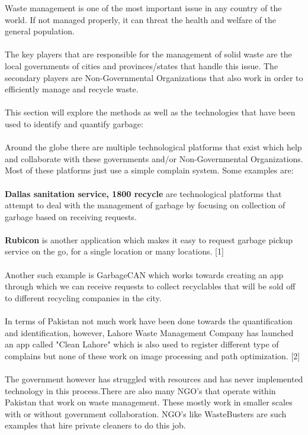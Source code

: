 Waste management is one of the most important issue in any country of the world. If not managed properly, it can threat the health and welfare of the general population.\\
\\
The key players that are responsible for the management of solid waste are the local governments of cities and provinces/states that handle this issue. The secondary players are Non-Governmental Organizations that also work in order to efficiently manage and recycle waste.\\
\\
This section will explore the methods as well as the technologies that have been used to identify and quantify garbage:\\
\\
Around the globe there are multiple technological platforms that exist which help and collaborate with these governments and/or Non-Governmental Organizations. Most of these platforms just use a simple complain system. Some examples are:\\
\\
\textbf{Dallas sanitation service, 1800 recycle} are technological platforms that attempt to deal with the management of garbage by focusing on collection of garbage based on receiving requests.\\
\\
\textbf{Rubicon} is another application which makes it easy to request garbage pickup service on the go, for a single location or many locations. [1]\\
\\
Another such example is GarbageCAN which works towards creating an app through which we can receive requests to collect recyclables that will be sold off to different recycling companies in the city.\\
\\
In terms of Pakistan not much work have been done towards the quantification and identification, however, Lahore Waste Management Company has launched an app called "Clean Lahore" which is also used to register different type of complains but none of these work on image processing and path optimization. [2]\\
\\
The government however has struggled with resources and has never implemented technology in this process.There are also many NGO's that operate within Pakistan that work on waste management. These mostly work in smaller scales with or without government collaboration. NGO's like WasteBusters are such examples that hire private cleaners to do this job.\\
